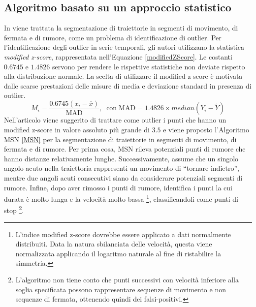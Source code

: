 \documentclass[12pt]{article}
\begin{document}
\subsection{Algoritmo basato su un approccio statistico}
In \cite{SpaceTimeTreshold} viene trattata la segmentazione di traiettorie in segmenti di movimento, di fermata e di rumore, come un problema di identificazione di outlier.
Per l'identificazione degli outlier in serie temporali, gli autori utilizzano la statistica \emph{modified z-score}, rappresentata nell'Equazione \ref{modifiedZScore}.
Le costanti $0.6745$ e $1.4826$ servono per rendere le rispettive statistiche non deviate rispetto alla distribuzione normale.
La scelta di utilizzare il modified z-score è motivata dalle scarse prestazioni delle misure di media e deviazione standard in presenza di outlier.
\begin{equation} \label{modifiedZScore}
    M_i = \frac{0.6745(x_i - \overline{x})}{\mathrm{MAD}},\;\;\mathrm{con}\;\mathrm{MAD} = 1.4826 \times median(Y_i - \widetilde{Y})
\end{equation}
Nell'articolo viene suggerito di trattare come outlier i punti che hanno un modified z-score in valore assoluto più grande di $3.5$ e viene proposto l'Algoritmo MSN \ref{MSN} per la segmentazione di traiettorie in segmenti di movimento, di fermata e di rumore.
Per prima cosa, MSN rileva potenziali punti di rumore che hanno distanze relativamente lunghe.
Successivamente, assume che un singolo angolo acuto nella traiettoria rappresenti un movimento di “tornare indietro”, mentre due angoli acuti consecutivi siano da considerare potenziali segmenti di rumore.
Infine, dopo aver rimosso i punti di rumore, identifica i punti la cui durata è molto lunga e la velocità molto bassa \footnote{L'indice modified z-score dovrebbe essere applicato a dati normalmente distribuiti. Data la natura sbilanciata delle velocità, questa viene normalizzata applicando il logaritmo naturale al fine di ristabilire la simmetria.},  classificandoli come punti di stop \footnote{L'algoritmo non tiene conto che punti successivi con velocità inferiore alla soglia specificata possono rappresentare sequenze di movimento e non sequenze di fermata, ottenendo quindi dei falsi-positivi.}.
\end{document}
